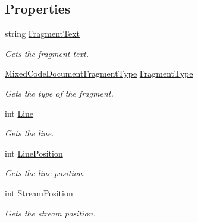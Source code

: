 \subsection*{Properties}
\begin{DoxyCompactItemize}
\item 
string \hyperlink{class_html_agility_pack_1_1_mixed_code_document_fragment_abb1dde76ebbf9684fc4a697569dda780}{Fragment\+Text}
\begin{DoxyCompactList}\small\item\em Gets the fragment text. \end{DoxyCompactList}\item 
\hyperlink{namespace_html_agility_pack_a98759dfaafbba2b5cc44e142b78624fd}{Mixed\+Code\+Document\+Fragment\+Type} \hyperlink{class_html_agility_pack_1_1_mixed_code_document_fragment_ad49ecf809c4235bb36122ce051c65a7d}{Fragment\+Type}
\begin{DoxyCompactList}\small\item\em Gets the type of the fragment. \end{DoxyCompactList}\item 
int \hyperlink{class_html_agility_pack_1_1_mixed_code_document_fragment_acd6a8961b9a933a88df6d13bc7458bd5}{Line}
\begin{DoxyCompactList}\small\item\em Gets the line. \end{DoxyCompactList}\item 
int \hyperlink{class_html_agility_pack_1_1_mixed_code_document_fragment_ae336da0418a68798c5f945b2f1c2647c}{Line\+Position}
\begin{DoxyCompactList}\small\item\em Gets the line position. \end{DoxyCompactList}\item 
int \hyperlink{class_html_agility_pack_1_1_mixed_code_document_fragment_ac00144fc95bf81a1673358ebfdf1d757}{Stream\+Position}
\begin{DoxyCompactList}\small\item\em Gets the stream position. \end{DoxyCompactList}\end{DoxyCompactItemize}


